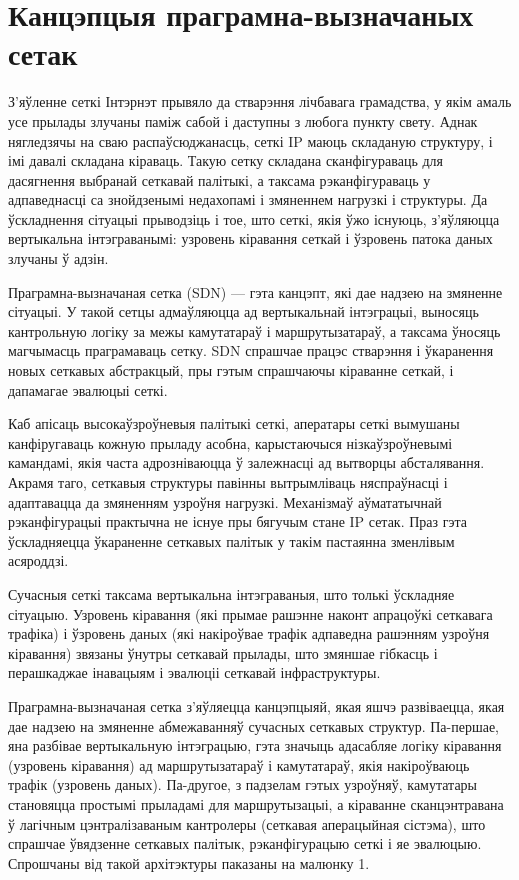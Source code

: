 \section{Канцэпцыя праграмна-вызначаных сетак}

З'яўленне сеткі Інтэрнэт прывяло да стварэння лічбавага грамадства, у якім
амаль усе прылады злучаны паміж сабой і даступны з любога пункту свету.
Аднак нягледзячы на сваю распаўсюджанасць, сеткі IP маюць складаную структуру, і імі
давалі складана кіраваць. Такую сетку складана сканфігураваць для дасягнення выбранай
сеткавай палітыкі, а таксама рэканфігураваць у адпаведнасці са знойдзенымі недахопамі і
змяненнем нагрузкі і структуры. Да ўскладнення сітуацыі прыводзіць і тое, што сеткі,
якія ўжо існуюць, з'яўляюцца вертыкальна інтэграванымі: узровень кіравання сеткай і
ўзровень патока даных злучаны ў адзін.

Праграмна-вызначаная сетка (SDN) --- гэта канцэпт, які дае надзею на змяненне сітуацыі.
У такой сетцы адмаўляюцца ад вертыкальнай інтэграцыі, выносяць кантрольную логіку
за межы камутатараў і маршрутызатараў, а таксама ўносяць магчымасць праграмаваць сетку.
SDN спрашчае працэс стварэння і ўкаранення новых сеткавых абстракцый, пры гэтым
спрашчаючы кіраванне сеткай, і дапамагае эвалюцыі сеткі.

Каб апісаць высокаўзроўневыя палітыкі сеткі, аператары сеткі вымушаны канфіругаваць кожную
прыладу асобна, карыстаючыся нізкаўзроўневымі камандамі, якія часта адрозніваюцца ў
залежнасці ад вытворцы абсталявання. Акрамя таго, сеткавыя структуры павінны
вытрымліваць няспраўнасці і адаптавацца да змяненням узроўня нагрузкі.
Механізмаў аўмататычнай рэканфігурацыі практычна не існуе пры бягучым стане IP сетак.
Праз гэта ўскладняецца ўкараненне сеткавых палітык у такім пастаянна зменлівым асяроддзі.

Сучасныя сеткі таксама вертыкальна інтэграваныя, што толькі ўскладняе сітуацыю.
Узровень кіравання (які прымае рашэнне наконт апрацоўкі сеткавага трафіка) і
ўзровень даных (які накіроўвае трафік адпаведна рашэнням узроўня кіравання) звязаны
ўнутры сеткавай прылады, што змяншае гібкасць і перашкаджае інавацыям і эвалюціі
сеткавай інфраструктуры.

Праграмна-вызначаная сетка з'яўляецца канцэпцыяй, якая яшчэ развіваецца, якая дае надзею
на змяненне абмежаванняў сучасных сеткавых структур.
Па-першае, яна разбівае вертыкальную інтэграцыю, гэта значыць адасабляе логіку кіравання
(узровень кіравання) ад маршрутызатараў і камутатараў, якія накіроўваюць трафік (узровень даных).
Па-другое, з падзелам гэтых узроўняў, камутатары становяцца простымі прыладамі для маршрутызацыі,
а кіраванне сканцэнтравана ў лагічным цэнтралізаваным кантролеры (сеткавая аперацыйная сістэма),
што спрашчае ўвядзенне сеткавых палітык, рэканфігурацыю сеткі і яе эвалюцыю.
Спрошчаны від такой архітэктуры паказаны на малюнку 1.

